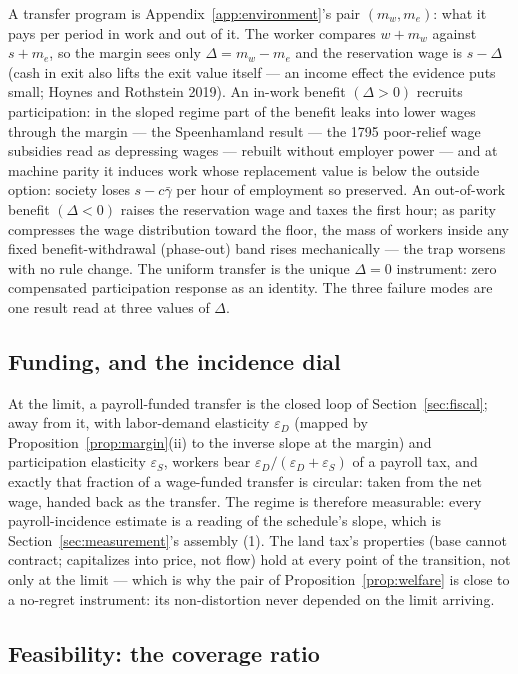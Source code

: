 \documentclass[12pt]{article}
\theoremstyle{plain}
\begin{document}
A transfer program is Appendix~\ref{app:environment}'s pair $(m_w, m_e)$: what it pays per period in work and out of it. The worker compares $w + m_w$ against $s + m_e$, so the margin sees only $\Delta = m_w - m_e$ and the reservation wage is $s - \Delta$ (cash in exit also lifts the exit value itself --- an income effect the evidence puts small; Hoynes and Rothstein 2019). An in-work benefit $(\Delta > 0)$ recruits participation: in the sloped regime part of the benefit leaks into lower wages through the margin --- the Speenhamland result --- the 1795 poor-relief wage subsidies read as depressing wages --- rebuilt without employer power --- and at machine parity it induces work whose replacement value is below the outside option: society loses $s - c\bar{\gamma}$ per hour of employment so preserved. An out-of-work benefit $(\Delta < 0)$ raises the reservation wage and taxes the first hour; as parity compresses the wage distribution toward the floor, the mass of workers inside any fixed benefit-withdrawal (phase-out) band rises mechanically --- the trap worsens with no rule change. The uniform transfer is the unique $\Delta = 0$ instrument: zero compensated participation response as an identity. The three failure modes are one result read at three values of $\Delta$.

\subsection{Funding, and the incidence dial}\label{app:funding}

At the limit, a payroll-funded transfer is the closed loop of Section~\ref{sec:fiscal}; away from it, with labor-demand elasticity $\varepsilon _D$ (mapped by Proposition~\ref{prop:margin}(ii) to the inverse slope at the margin) and participation elasticity $\varepsilon _S$, workers bear $\varepsilon _D/(\varepsilon _D+\varepsilon _S)$ of a payroll tax, and exactly that fraction of a wage-funded transfer is circular: taken from the net wage, handed back as the transfer. The regime is therefore measurable: every payroll-incidence estimate is a reading of the schedule's slope, which is Section~\ref{sec:measurement}'s assembly (1). The land tax's properties (base cannot contract; capitalizes into price, not flow) hold at every point of the transition, not only at the limit --- which is why the pair of Proposition~\ref{prop:welfare} is close to a no-regret instrument: its non-distortion never depended on the limit arriving.

\subsection{Feasibility: the coverage ratio}\label{app:coverage}
\end{document}
